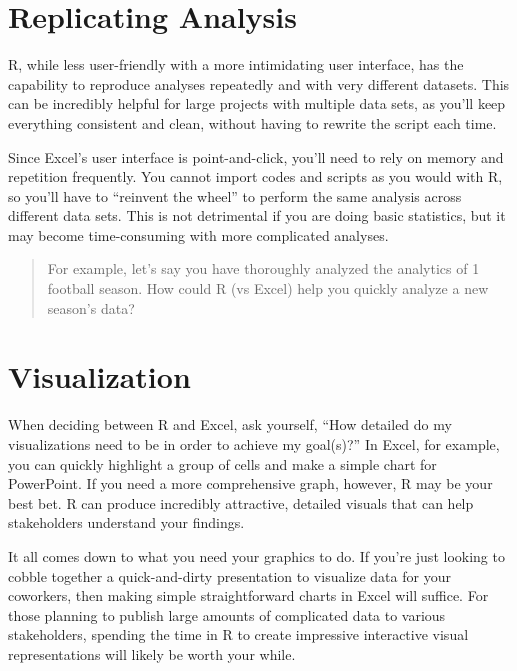 \documentclass[
]{book}
\begin{document}
\hypertarget{replicating-analysis}{%
\section{Replicating Analysis}\label{replicating-analysis}}

R, while less user-friendly with a more intimidating user interface, has the capability to reproduce analyses repeatedly and with very different datasets. This can be incredibly helpful for large projects with multiple data sets, as you'll keep everything consistent and clean, without having to rewrite the script each time.

Since Excel's user interface is point-and-click, you'll need to rely on memory and repetition frequently. You cannot import codes and scripts as you would with R, so you'll have to ``reinvent the wheel'' to perform the same analysis across different data sets. This is not detrimental if you are doing basic statistics, but it may become time-consuming with more complicated analyses.

\begin{quote}
For example, let's say you have thoroughly analyzed the analytics of 1 football season. How could R (vs Excel) help you quickly analyze a new season's data?
\end{quote}

\hypertarget{visualization}{%
\section{Visualization}\label{visualization}}

When deciding between R and Excel, ask yourself, ``How detailed do my visualizations need to be in order to achieve my goal(s)?'' In Excel, for example, you can quickly highlight a group of cells and make a simple chart for PowerPoint. If you need a more comprehensive graph, however, R may be your best bet. R can produce incredibly attractive, detailed visuals that can help stakeholders understand your findings.

It all comes down to what you need your graphics to do. If you're just looking to cobble together a quick-and-dirty presentation to visualize data for your coworkers, then making simple straightforward charts in Excel will suffice. For those planning to publish large amounts of complicated data to various stakeholders, spending the time in R to create impressive interactive visual representations will likely be worth your while.
\end{document}
